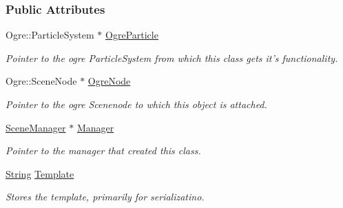 \subsubsection*{Public Attributes}
\begin{DoxyCompactItemize}
\item 
\hypertarget{structphys_1_1internal_1_1ParticleEffectInternalData_a2a9776a843e39608d4a4583e4558a2c0}{
Ogre::ParticleSystem $\ast$ \hyperlink{structphys_1_1internal_1_1ParticleEffectInternalData_a2a9776a843e39608d4a4583e4558a2c0}{OgreParticle}}
\label{structphys_1_1internal_1_1ParticleEffectInternalData_a2a9776a843e39608d4a4583e4558a2c0}

\begin{DoxyCompactList}\small\item\em Pointer to the ogre ParticleSystem from which this class gets it's functionality. \item\end{DoxyCompactList}\item 
\hypertarget{structphys_1_1internal_1_1ParticleEffectInternalData_a339dac2408197459041f2524badc619e}{
Ogre::SceneNode $\ast$ \hyperlink{structphys_1_1internal_1_1ParticleEffectInternalData_a339dac2408197459041f2524badc619e}{OgreNode}}
\label{structphys_1_1internal_1_1ParticleEffectInternalData_a339dac2408197459041f2524badc619e}

\begin{DoxyCompactList}\small\item\em Pointer to the ogre Scenenode to which this object is attached. \item\end{DoxyCompactList}\item 
\hypertarget{structphys_1_1internal_1_1ParticleEffectInternalData_a6e039c2445dcaac7f9a586863affe030}{
\hyperlink{classphys_1_1SceneManager}{SceneManager} $\ast$ \hyperlink{structphys_1_1internal_1_1ParticleEffectInternalData_a6e039c2445dcaac7f9a586863affe030}{Manager}}
\label{structphys_1_1internal_1_1ParticleEffectInternalData_a6e039c2445dcaac7f9a586863affe030}

\begin{DoxyCompactList}\small\item\em Pointer to the manager that created this class. \item\end{DoxyCompactList}\item 
\hypertarget{structphys_1_1internal_1_1ParticleEffectInternalData_a5c9857e01d36e5957887c1853042bcf2}{
\hyperlink{namespacephys_aa03900411993de7fbfec4789bc1d392e}{String} \hyperlink{structphys_1_1internal_1_1ParticleEffectInternalData_a5c9857e01d36e5957887c1853042bcf2}{Template}}
\label{structphys_1_1internal_1_1ParticleEffectInternalData_a5c9857e01d36e5957887c1853042bcf2}

\begin{DoxyCompactList}\small\item\em Stores the template, primarily for serializatino. \item\end{DoxyCompactList}\end{DoxyCompactItemize}


